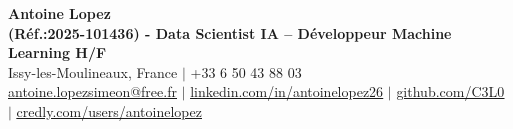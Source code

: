 \documentclass[letterpaper,10pt]{article}
\begin{document}
\begin{center}
    {\Huge \textbf{Antoine Lopez}} \\ \vspace{2pt}
    {\large \textbf{(Réf.:2025-101436) - Data Scientist IA – Développeur Machine Learning H/F}} \\ \vspace{3pt}
    \small
    Issy-les-Moulineaux, France $|$ +33 6 50 43 88 03 \\
    \href{mailto:antoine.lopezsimeon@free.fr}{\underline{antoine.lopezsimeon@free.fr}} $|$ 
    \href{https://linkedin.com/in/antoinelopez26}{\underline{linkedin.com/in/antoinelopez26}} $|$
    \href{https://github.com/C3L0}{\underline{github.com/C3L0}} $|$
    \href{https://www.credly.com/users/antoinelopez26}{\underline{credly.com/users/antoinelopez}}
\end{center}

\vspace{-10pt}







\end{document}
